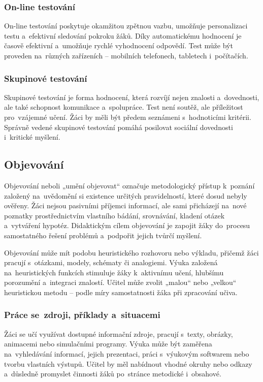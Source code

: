\documentclass[male,czech,api_bc]{kitheses}
\begin{document}
\subsubsection{On-line testování}
On-line testování poskytuje okamžitou zpětnou vazbu, umožňuje personalizaci testu a~efektivní sledování pokroku žáků. Díky automatickému hodnocení je časově efektivní a~umožňuje rychlé vyhodnocení odpovědí. Test může být proveden na~různých zařízeních – mobilních telefonech, tabletech i~počítačích.

\subsubsection{Skupinové testování}
Skupinové testování je forma hodnocení, která rozvíjí nejen znalosti a~dovednosti, ale také schopnost komunikace a~spolupráce. Test není soutěž, ale příležitost pro~vzájemné učení. Žáci by měli být předem seznámeni s~hodnoticími kritérii. Správně vedené skupinové testování pomáhá posilovat sociální dovednosti i~kritické myšlení.

\subsection{Objevování}

Objevování neboli „umění objevovat“ označuje metodologický přístup k~poznání založený na~uvědomění si existence určitých pravidelností, které dosud nebyly ověřeny. Žáci nejsou pasivními příjemci informací, ale sami přicházejí na~nové poznatky prostřednictvím vlastního bádání, srovnávání, kladení otázek a~vytváření hypotéz. Didaktickým cílem objevování je zapojit žáky do~procesu samostatného řešení problémů a~podpořit jejich tvůrčí myšlení.

Objevování může mít podobu heuristického rozhovoru nebo výkladu, přičemž žáci pracují s~otázkami, modely, schématy či analogiemi. Výuka založená na~heuristických funkcích stimuluje žáky k~aktivnímu učení, hlubšímu porozumění a~integraci znalostí. Učitel může zvolit „malou“ nebo „velkou“ heuristickou metodu – podle míry samostatnosti žáka při zpracování učiva.

\subsubsection{Práce se~zdroji, příklady a~situacemi}

Žáci se učí využívat dostupné informační zdroje, pracují s~texty, obrázky, animacemi nebo simulačními programy. Výuka může být zaměřena na~vyhledávání informací, jejich prezentaci, práci s~výukovým softwarem nebo tvorbu vlastních výstupů. Učitel by měl nabídnout vhodné okruhy nebo odkazy a~důsledně promyslet činnosti žáků po~stránce metodické i~obsahové.
\end{document}
